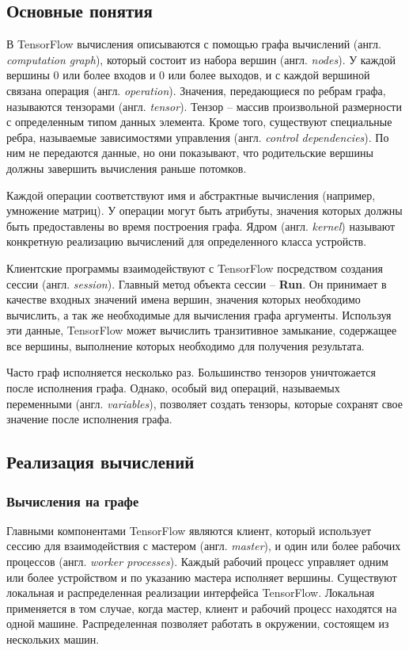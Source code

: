 \subsection{Основные понятия}

В TensorFlow вычисления описываются с помощью графа вычислений (англ.
\textit{computation graph}), который состоит из набора вершин (англ.
\textit{nodes}). У каждой вершины 0 или более входов и 0 или более выходов,
и с каждой вершиной связана операция (англ. \textit{operation}). Значения,
передающиеся по ребрам графа, называются тензорами (англ. \textit{tensor}).
Тензор -- массив произвольной размерности с определенным типом данных элемента.
Кроме того, существуют специальные ребра, называемые зависимостями управления
(англ. \textit{control dependencies}). По ним не передаются данные, но они
показывают, что родительские вершины должны завершить вычисления раньше потомков.

Каждой операции соответствуют имя и абстрактные вычисления (например, умножение
матриц). У операции могут быть атрибуты, значения которых должны быть
предоставлены во время построения графа. Ядром (англ. \textit{kernel}) называют
конкретную реализацию вычислений для определенного класса устройств.

Клиентские программы взаимодействуют с TensorFlow посредством создания сессии
(англ. \textit{session}). Главный метод объекта сессии -- \textbf{Run}. Он
принимает в качестве входных значений имена вершин, значения которых необходимо
вычислить, а так же необходимые для вычисления графа аргументы. Используя эти
данные, TensorFlow может вычислить транзитивное замыкание, содержащее все
вершины, выполнение которых необходимо для получения результата.

Часто граф исполняется несколько раз. Большинство тензоров уничтожается после
исполнения графа. Однако, особый вид операций, называемых переменными (англ.
\textit{variables}), позволяет создать тензоры, которые сохранят свое значение
после исполнения графа.

\subsection{Реализация вычислений}

\subsubsection{Вычисления на графе}

Главными компонентами TensorFlow являются клиент, который использует сессию
для взаимодействия с мастером (англ. \textit{master}), и один или более
рабочих процессов (англ. \textit{worker processes}). Каждый рабочий процесс
управляет одним или более устройством и по указанию мастера исполняет вершины.
Существуют локальная и распределенная реализации интерфейса TensorFlow.
Локальная применяется в том случае, когда мастер, клиент и рабочий процесс
находятся на одной машине. Распределенная позволяет работать в окружении,
состоящем из нескольких машин.

